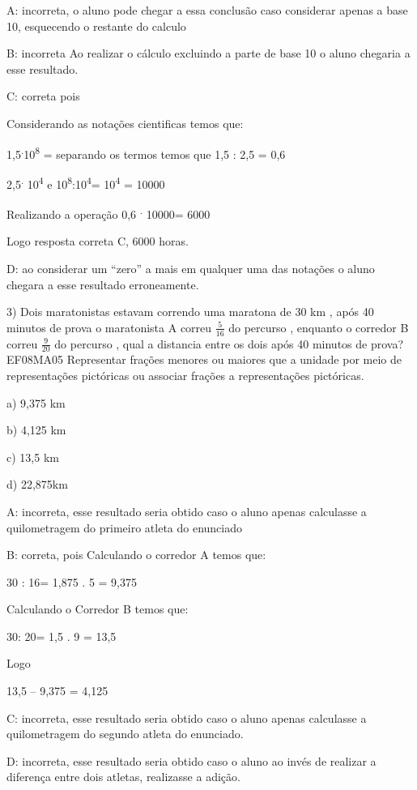A: incorreta, o aluno pode chegar a essa conclusão caso considerar
apenas a base 10, esquecendo o restante do calculo

B: incorreta Ao realizar o cálculo excluindo a parte de base 10 o aluno
chegaria a esse resultado.

C: correta pois

Considerando as notações cientificas temos que:

1,5\textsuperscript{.}10\textsuperscript{8} = separando os termos temos
que 1,5 : 2,5 = 0,6

2,5\textsuperscript{.} 10\textsuperscript{4} e
10\textsuperscript{8}:10\textsuperscript{4}= 10\textsuperscript{4} =
10000

Realizando a operação 0,6 \textsuperscript{.} 10000= 6000

Logo resposta correta C, 6000 horas.

D: ao considerar um ``zero'' a mais em qualquer uma das notações o aluno
chegara a esse resultado erroneamente.

3) Dois maratonistas estavam correndo uma maratona de 30 km , após 40
minutos de prova o maratonista A correu \(\frac{5}{16}\) do percurso ,
enquanto o corredor B correu \(\frac{9}{20}\) do percurso , qual a
distancia entre os dois após 40 minutos de prova? EF08MA05 Representar
frações menores ou maiores que a unidade por meio de representações
pictóricas ou associar frações a representações pictóricas.

a) 9,375 km

b) 4,125 km

c) 13,5 km

d) 22,875km

A: incorreta, esse resultado seria obtido caso o aluno apenas calculasse
a quilometragem do primeiro atleta do enunciado

B: correta, pois Calculando o corredor A temos que:

30 : 16= 1,875 . 5 = 9,375

Calculando o Corredor B temos que:

30: 20= 1,5 . 9 = 13,5

Logo

13,5 -- 9,375 = 4,125

C: incorreta, esse resultado seria obtido caso o aluno apenas calculasse
a quilometragem do segundo atleta do enunciado.

D: incorreta, esse resultado seria obtido caso o aluno ao invés de
realizar a diferença entre dois atletas, realizasse a adição.

